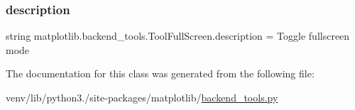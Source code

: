 \subsubsection{\texorpdfstring{description}{description}}
{\footnotesize\ttfamily string matplotlib.\+backend\+\_\+tools.\+Tool\+Full\+Screen.\+description = \textquotesingle{}Toggle fullscreen mode\textquotesingle{}\hspace{0.3cm}{\ttfamily [static]}}



The documentation for this class was generated from the following file\+:\begin{DoxyCompactItemize}
\item 
venv/lib/python3./site-\/packages/matplotlib/\hyperlink{backend__tools_8py}{backend\+\_\+tools.\+py}\end{DoxyCompactItemize}
